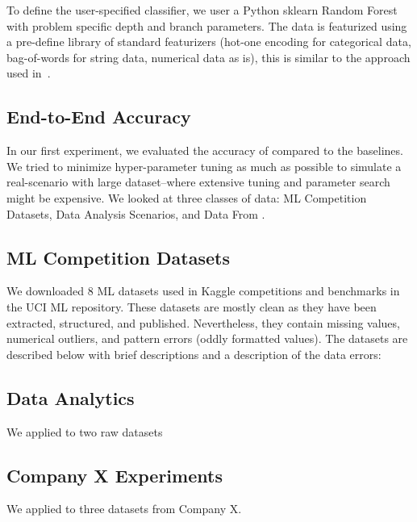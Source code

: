 To define the user-specified classifier, we user a Python \textsf{sklearn} Random Forest with problem specific depth and branch parameters.
The data is featurized using a pre-define library of standard featurizers (hot-one encoding for categorical data, bag-of-words for string data, numerical data as is), this is similar to the approach used in~\cite{DBLP:conf/sigmod/GokhaleDDNRSZ14}.

\subsection{End-to-End Accuracy}
In our first experiment, we evaluated the accuracy of \sys compared to the baselines.
We tried to minimize hyper-parameter tuning as much as possible to simulate a real-scenario with large dataset--where extensive tuning and parameter search might be expensive.
We looked at three classes of data: ML Competition Datasets, Data Analysis Scenarios, and Data From \company.

\subsection{ML Competition Datasets}
We downloaded 8 ML datasets used in Kaggle competitions and benchmarks in the UCI ML repository. 
These datasets are mostly clean as they have been extracted, structured, and published.
Nevertheless, they contain missing values, numerical outliers, and pattern errors (oddly formatted values).
The datasets are described below with brief descriptions and a description of the data errors:

\vspace{0.5em}


\subsection{Data Analytics}
We applied \sys to two raw datasets


\subsection{Company X Experiments}
We applied \sys to three datasets from Company X.



